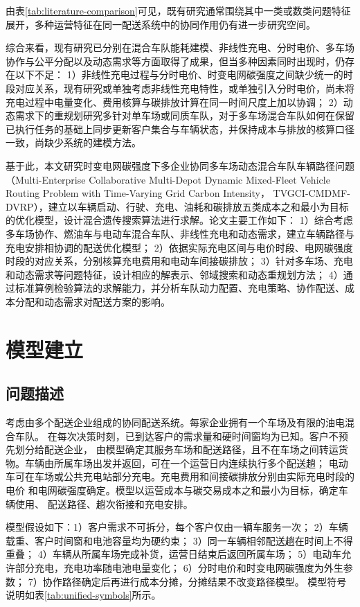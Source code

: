 \documentclass{setp-new}
\begin{document}
由表\ref{tab:literature-comparison}可见，既有研究通常围绕其中一类或数类问题特征展开，多种运营特征在同一配送系统中的协同作用仍有进一步研究空间。

综合来看，现有研究已分别在混合车队能耗建模、非线性充电、分时电价、多车场协作与公平分配以及动态需求等方面取得了成果，但当多种因素同时出现时，仍存在以下不足：
1）非线性充电过程与分时电价、时变电网碳强度之间缺少统一的时段对应关系，现有研究或单独考虑非线性充电特性，或单独引入分时电价，尚未将充电过程中电量变化、费用核算与碳排放计算在同一时间尺度上加以协调；
2）动态需求下的重规划研究多针对单车场或同质车队，对于多车场混合车队如何在保留已执行任务的基础上同步更新客户集合与车辆状态，并保持成本与排放的核算口径一致，尚缺少系统的建模方法。

基于此，本文研究时变电网碳强度下多企业协同多车场动态混合车队车辆路径问题
（Multi-Enterprise Collaborative Multi-Depot Dynamic Mixed-Fleet Vehicle Routing Problem with Time-Varying Grid Carbon Intensity，
TVGCI-CMDMF-DVRP），建立以车辆启动、行驶、充电、油耗和碳排放五类成本之和最小为目标的优化模型，设计混合遗传搜索算法进行求解。论文主要工作如下：
1）综合考虑多车场协作、燃油车与电动车混合车队、非线性充电和动态需求，建立车辆路径与充电安排相协调的配送优化模型；
2）依据实际充电区间与电价时段、电网碳强度时段的对应关系，分别核算充电费用和电动车间接碳排放；
3）针对多车场、充电和动态需求等问题特征，设计相应的解表示、邻域搜索和动态重规划方法；
4）通过标准算例检验算法的求解能力，并分析车队动力配置、充电策略、协作配送、成本分配和动态需求对配送方案的影响。
\section{模型建立}

\subsection{问题描述}

考虑由多个配送企业组成的协同配送系统。每家企业拥有一个车场及有限的油电混合车队。
在每次决策时刻，已到达客户的需求量和硬时间窗均为已知。客户不预先划分给配送企业，
由模型确定其服务车场和配送路径，且不在车场之间转运货物。车辆由所属车场出发并返回，可在一个运营日内连续执行多个配送趟；
电动车可在车场或公共充电站部分充电。充电费用和间接碳排放分别由实际充电时段的电价
和电网碳强度确定。模型以运营成本与碳交易成本之和最小为目标，确定车辆使用、
配送路径、趟次衔接和充电安排。

模型假设如下：1）客户需求不可拆分，每个客户仅由一辆车服务一次；
2）车辆载重、客户时间窗和电池容量均为硬约束；
3）同一车辆相邻配送趟在时间上不得重叠；
4）车辆从所属车场完成补货，运营日结束后返回所属车场；
5）电动车允许部分充电，充电功率随电池电量变化；
6）分时电价和时变电网碳强度为外生参数；
7）协作路径确定后再进行成本分摊，分摊结果不改变路径模型。
模型符号说明如表\ref{tab:unified-symbols}所示。
\end{document}
